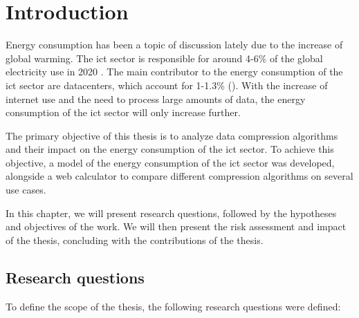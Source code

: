 

\chapter{Introduction}
\label{chapter:introduction}

\begin{introduction}

Energy consumption has been a topic of discussion lately due to the increase of global warming. The \ac{ict} sector is responsible for around 4-6\% of the global electricity use in 2020 \citet{UK-parliament}. The main contributor to the energy consumption of the \ac{ict} sector are datacenters, which account for  1-1.3\% (\citet{IEA}). With the increase of internet use and the need to process large amounts of data, the energy consumption of the \ac{ict} sector will only increase further.

The primary objective of this thesis is to analyze data compression algorithms and their impact on the energy consumption of the \ac{ict} sector.
To achieve this objective, a model of the energy consumption of the \ac{ict} sector was developed, alongside a web calculator to compare different compression algorithms on several use cases. 

In this chapter, we will present research questions, followed by the hypotheses and objectives of the work. We will then present the risk assessment and impact of the thesis, concluding with the contributions of the thesis. 

\end{introduction}

\section{Research questions}
\label{section:research_questions}

To define the scope of the thesis, the following research questions were defined:

